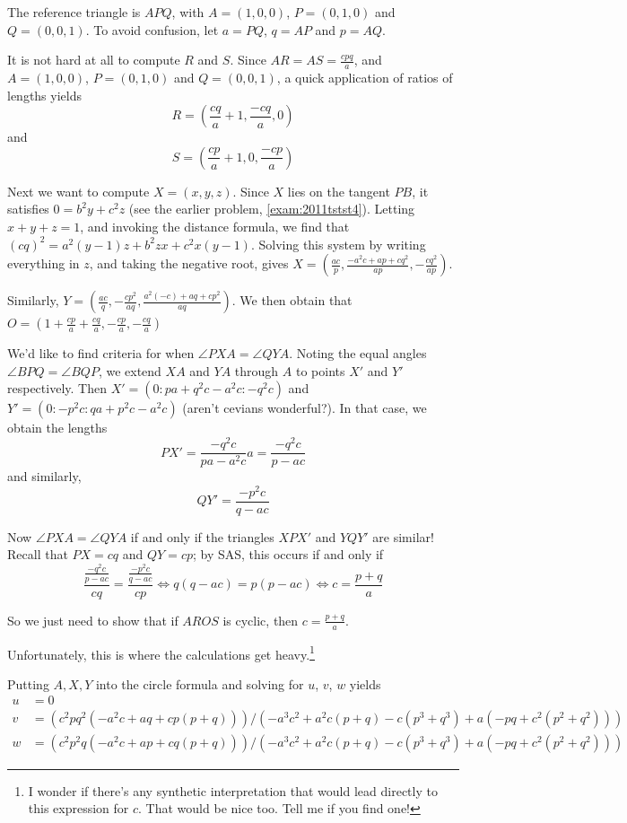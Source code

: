 \begin{soln}
  The reference triangle is $APQ$, with $A=(1,0,0)$, $P=(0,1,0)$ and $Q=(0,0,1)$.  To avoid confusion, let $a=PQ$, $q=AP$ and $p=AQ$.

  It is not hard at all to compute $R$ and $S$.  Since $AR = AS = \frac{cpq}{a}$, and $A=(1,0,0)$, $P=(0,1,0)$ and $Q=(0,0,1)$, a quick application of ratios of lengths yields \[ R=\left(\frac{c q}{a}+1,\frac{-c q}{a},0\right) \] and \[ S=\left(\frac{c p}{a}+1,0,\frac{-c p}{a}\right)\]

  Next we want to compute $X=(x,y,z)$.  Since $X$ lies on the tangent $PB$, it satisfies $0=b^2y+c^2z$ (see the earlier problem, \ref{exam:2011tstst4}).  Letting $x+y+z=1$, and invoking the distance formula, we find that $(cq)^2 = a^2(y-1)z + b^2zx + c^2x(y-1)$.  Solving this system by writing everything in $z$, and taking the negative root, gives $X = \left( \frac{a c}{p},\frac{-a^2 c+a p+c q^2}{a p},-\frac{c q^2}{a p} \right)$.

  Similarly, $Y = \left( \frac{a c}{q},-\frac{c p^2}{a q},\frac{a^2 (-c)+a q+c p^2}{a q} \right)$.  We then obtain that $O = \left( 1+\frac{c p}{a}+\frac{c q}{a},-\frac{c p}{a},-\frac{c q}{a}\right)$

  We'd like to find criteria for when $\angle PXA = \angle QYA$.  Noting the equal angles $\angle BPQ = \angle BQP$, we extend $XA$ and $YA$ through $A$ to points $X'$ and $Y'$ respectively.  Then $X' = (0 : pa + q^2c - a^2c : -q^2c)$ and $Y'=(0 : -p^2c : qa + p^2c - a^2 c)$ (aren't cevians wonderful?).  In that case, we obtain the lengths \[ PX' = \frac{-q^2c}{pa-a^2c} a = \frac{-q^2c}{p-ac} \] and similarly, \[ QY' = \frac{-p^2c}{q-ac} \]

  Now $\angle PXA = \angle QYA$ if and only if the triangles $XPX'$ and $YQY'$ are similar!  Recall that $PX=cq$ and $QY=cp$; by SAS, this occurs if and only if
  \[ \frac{ \frac{-q^2c}{p-ac} }{cq} = \frac{ \frac{-p^2c}{q-ac} }{cp} \iff q(q-ac) = p(p-ac) \iff c = \frac{p+q}{a}\]

  So we just need to show that if $AROS$ is cyclic, then $c=\frac{p+q}{a}$.

  \bigskip \bigskip

  Unfortunately, this is where the calculations get heavy.\footnote{I wonder if there's any synthetic interpretation that would lead directly to this expression for $c$.  That would be nice too.  Tell me if you find one!}

  Putting $A,X,Y$ into the circle formula and solving for $u$, $v$, $w$ yields
  \begin{align*}
    u &= 0 \\
    v &= (c^2 p q^2 (-a^2 c + a q + c p (p + q)))/(-a^3 c^2 + a^2 c (p + q) - c (p^3 + q^3) + a (-p q + c^2 (p^2 + q^2))) \\
      w &= ( c^2 p^2 q (-a^2 c + a p + c q (p + q)))/(-a^3 c^2 + a^2 c (p + q) - c (p^3 + q^3) + a (-p q + c^2 (p^2 + q^2)))
  \end{align*}


\end{soln}
